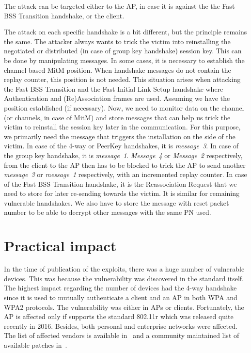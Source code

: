 The attack can be targeted either to the AP, in case it is against the the Fast BSS Transition handshake, or the client. 

The attack on each specific handshake is a bit different, but the principle remains the same. The attacker always wants to trick the victim into reinstalling the negotiated or distributed (in case of group key handshake) session key. This can be done by manipulating messages. In some cases, it is necessary to establish the channel based MitM position. When handshake messages do not contain the replay counter, this position is not needed. This situation arises when attacking the Fast BSS Transition and the Fast Initial Link Setup handshake where Authentication and (Re)Association frames are used. Assuming we have the position established (if necessary). Now, we need to monitor data on the channel (or channels, in case of MitM) and store messages that can help us trick the victim to reinstall the session key later in the communication. For this purpose, we primarily need the message that triggers the installation on the side of the victim. In case of the 4-way or PeerKey handshakes, it is \textit{message~3}. In case of the group key handshake, it is \textit{message~1}. \textit{Message~4} or \textit{Message~2} respectively, from the client to the AP then has to be blocked to trick the AP to send another \textit{message~3} or \textit{message~1} respectively, with an incremented replay counter. In case of the Fast BSS Transition handshake, it is the Reassociation Request that we need to store for later re-sending towards the victim. It is similar for remaining vulnerable handshakes. We also have to store the message with reset packet number to be able to decrypt other messages with the same PN used.

\section{Practical impact}

In the time of publication of the exploits, there was a huge number of vulnerable devices. This was because the vulnerability was discovered in the standard itself. The highest impact regarding the number of devices had the 4-way handshake since it is used to mutually authenticate a client and an AP in both WPA and WPA2 protocols. The vulnerability was either in APs or clients. Fortunately, the AP is affected only if supports the standard 802.11r which was released quite recently in 2016. Besides, both personal and enterprise networks were affected. The list of affected vendors is available in~\cite{carnegie_mellon_university_2017} and a community maintained list of available patches in~\cite{kristate_2018}. 

